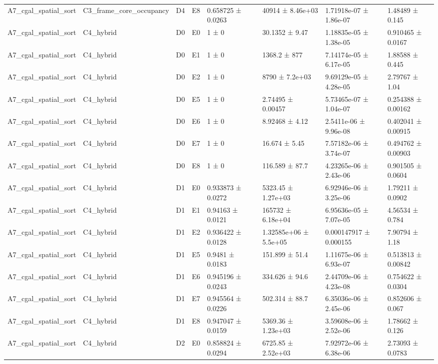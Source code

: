 \begin{table}
\begin{tabular}{lllllllll}
A7\_cgal\_spatial\_sort & C3\_frame\_core\_occupancy & D4 & E8 & 0.658725 ± 0.0263 &  & 40914 ± 8.46e+03 & 1.71918e-07 ± 1.86e-07 & 1.48489 ± 0.145 \\
A7\_cgal\_spatial\_sort & C4\_hybrid & D0 & E0 & 1 ± 0 &  & 30.1352 ± 9.47 & 1.18835e-05 ± 1.38e-05 & 0.910465 ± 0.0167 \\
A7\_cgal\_spatial\_sort & C4\_hybrid & D0 & E1 & 1 ± 0 &  & 1368.2 ± 877 & 7.14174e-05 ± 6.17e-05 & 1.88588 ± 0.445 \\
A7\_cgal\_spatial\_sort & C4\_hybrid & D0 & E2 & 1 ± 0 &  & 8790 ± 7.2e+03 & 9.69129e-05 ± 4.28e-05 & 2.79767 ± 1.04 \\
A7\_cgal\_spatial\_sort & C4\_hybrid & D0 & E5 & 1 ± 0 &  & 2.74495 ± 0.00457 & 5.73465e-07 ± 1.04e-07 & 0.254388 ± 0.00162 \\
A7\_cgal\_spatial\_sort & C4\_hybrid & D0 & E6 & 1 ± 0 &  & 8.92468 ± 4.12 & 2.5411e-06 ± 9.96e-08 & 0.402041 ± 0.00915 \\
A7\_cgal\_spatial\_sort & C4\_hybrid & D0 & E7 & 1 ± 0 &  & 16.674 ± 5.45 & 7.57182e-06 ± 3.74e-07 & 0.494762 ± 0.00903 \\
A7\_cgal\_spatial\_sort & C4\_hybrid & D0 & E8 & 1 ± 0 &  & 116.589 ± 87.7 & 4.23265e-06 ± 2.43e-06 & 0.901505 ± 0.0604 \\
A7\_cgal\_spatial\_sort & C4\_hybrid & D1 & E0 & 0.933873 ± 0.0272 &  & 5323.45 ± 1.27e+03 & 6.92946e-06 ± 3.25e-06 & 1.79211 ± 0.0902 \\
A7\_cgal\_spatial\_sort & C4\_hybrid & D1 & E1 & 0.94163 ± 0.0121 &  & 165732 ± 6.18e+04 & 6.95636e-05 ± 7.07e-05 & 4.56534 ± 0.784 \\
A7\_cgal\_spatial\_sort & C4\_hybrid & D1 & E2 & 0.936422 ± 0.0128 &  & 1.32585e+06 ± 5.5e+05 & 0.000147917 ± 0.000155 & 7.90794 ± 1.18 \\
A7\_cgal\_spatial\_sort & C4\_hybrid & D1 & E5 & 0.9481 ± 0.0183 &  & 151.899 ± 51.4 & 1.11675e-06 ± 6.93e-07 & 0.513813 ± 0.00842 \\
A7\_cgal\_spatial\_sort & C4\_hybrid & D1 & E6 & 0.945196 ± 0.0243 &  & 334.626 ± 94.6 & 2.44709e-06 ± 4.23e-08 & 0.754622 ± 0.0304 \\
A7\_cgal\_spatial\_sort & C4\_hybrid & D1 & E7 & 0.945564 ± 0.0226 &  & 502.314 ± 88.7 & 6.35036e-06 ± 2.45e-06 & 0.852606 ± 0.067 \\
A7\_cgal\_spatial\_sort & C4\_hybrid & D1 & E8 & 0.947047 ± 0.0159 &  & 5369.36 ± 1.23e+03 & 3.59608e-06 ± 2.52e-06 & 1.78662 ± 0.126 \\
A7\_cgal\_spatial\_sort & C4\_hybrid & D2 & E0 & 0.858824 ± 0.0294 &  & 6725.85 ± 2.52e+03 & 7.92972e-06 ± 6.38e-06 & 2.73093 ± 0.0783 \\

\end{tabular}
\end{table}
